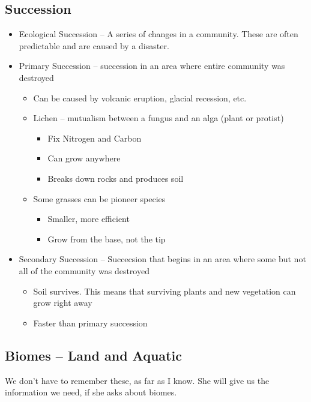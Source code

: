 \documentclass{article}
\begin{document}
\subsection{Succession}
\begin{itemize}
\item Ecological Succession -- A series of changes in a community. These are often predictable and are caused by a disaster.
\item Primary Succession -- succession in an area where entire community was destroyed
\begin{itemize}
\item Can be caused by volcanic eruption, glacial recession, etc.
\item Lichen -- mutualism between a fungus and an alga (plant or protist)
\begin{itemize}
\item Fix Nitrogen and Carbon
\item Can grow anywhere
\item Breaks down rocks and produces soil
\end{itemize}
\item Some grasses can be pioneer species
\begin{itemize}
\item Smaller, more efficient
\item Grow from the base, not the tip
\end{itemize}
\end{itemize}
\item Secondary Succession -- Succecsion that begins in an area where some but not all of the community was destroyed
\begin{itemize}
\item Soil survives. This means that surviving plants and new vegetation can grow right away
\item Faster than primary succession
\end{itemize}
\end{itemize}

\subsection{Biomes -- Land and Aquatic}
We don't have to remember these, as far as I know.
She will give us the information we need, if she asks about biomes.
\end{document}
